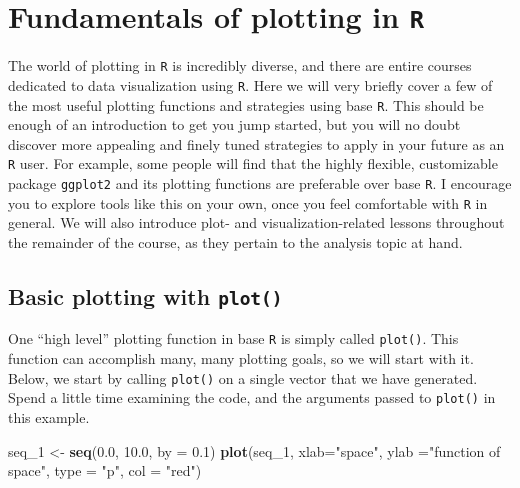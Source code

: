 \documentclass[]{book}
\newenvironment{Shaded}{\begin{snugshade}}{\end{snugshade}}
\newcommand{\DataTypeTok}[1]{\textcolor[rgb]{0.13,0.29,0.53}{#1}}
\newcommand{\DecValTok}[1]{\textcolor[rgb]{0.00,0.00,0.81}{#1}}
\newcommand{\FloatTok}[1]{\textcolor[rgb]{0.00,0.00,0.81}{#1}}
\newcommand{\KeywordTok}[1]{\textcolor[rgb]{0.13,0.29,0.53}{\textbf{#1}}}
\newcommand{\NormalTok}[1]{#1}
\newcommand{\StringTok}[1]{\textcolor[rgb]{0.31,0.60,0.02}{#1}}
\begin{document}
\hypertarget{fundamentals-of-plotting-in-r}{%
\section{\texorpdfstring{Fundamentals of plotting in \texttt{R}}{Fundamentals of plotting in R}}\label{fundamentals-of-plotting-in-r}}

The world of plotting in \texttt{R} is incredibly diverse, and there are entire courses dedicated to data visualization using \texttt{R}. Here we will very briefly cover a few of the most useful plotting functions and strategies using base \texttt{R}. This should be enough of an introduction to get you jump started, but you will no doubt discover more appealing and finely tuned strategies to apply in your future as an \texttt{R} user. For example, some people will find that the highly flexible, customizable package \texttt{ggplot2} and its plotting functions are preferable over base \texttt{R}. I encourage you to explore tools like this on your own, once you feel comfortable with \texttt{R} in general. We will also introduce plot- and visualization-related lessons throughout the remainder of the course, as they pertain to the analysis topic at hand.

\hypertarget{basic-plotting-with-plot}{%
\subsection{\texorpdfstring{Basic plotting with \texttt{plot()}}{Basic plotting with plot()}}\label{basic-plotting-with-plot}}

One ``high level'' plotting function in base \texttt{R} is simply called \texttt{plot()}. This function can accomplish many, many plotting goals, so we will start with it. Below, we start by calling \texttt{plot()} on a single vector that we have generated. Spend a little time examining the code, and the arguments passed to \texttt{plot()} in this example.

\begin{Shaded}
\begin{Highlighting}[]
\NormalTok{seq_}\DecValTok{1}\NormalTok{ <-}\StringTok{ }\KeywordTok{seq}\NormalTok{(}\FloatTok{0.0}\NormalTok{, }\FloatTok{10.0}\NormalTok{, }\DataTypeTok{by =} \FloatTok{0.1}\NormalTok{) }
\KeywordTok{plot}\NormalTok{(seq_}\DecValTok{1}\NormalTok{, }\DataTypeTok{xlab=}\StringTok{"space"}\NormalTok{, }\DataTypeTok{ylab =}\StringTok{"function of space"}\NormalTok{, }\DataTypeTok{type =} \StringTok{"p"}\NormalTok{, }\DataTypeTok{col =} \StringTok{"red"}\NormalTok{)}
\end{Highlighting}
\end{Shaded}
\end{document}
